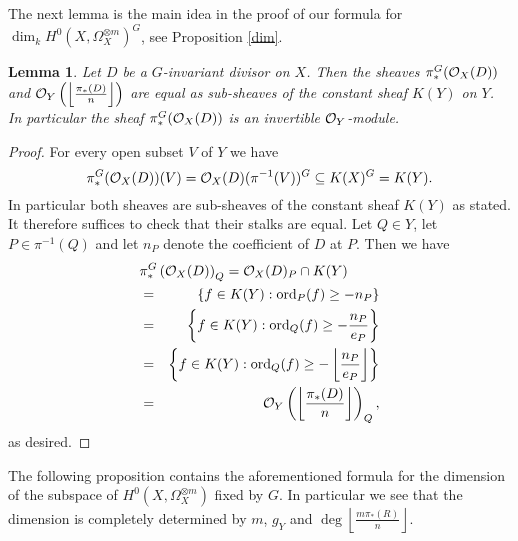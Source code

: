 \documentclass[11pt]{article} %
\newtheorem{lem}{Lemma}
\theoremstyle{remark}\newtheorem*{rem}{Remark}
\newcommand{\cO}{{\cal O}}
\begin{document}
The next lemma is the main idea in the proof of our formula for $\dim_kH^0(X,\Omega_X^{\otimes m})^G$, see Proposition \ref{dim}. \\


  \begin{lem}
    Let $D$ be a $G$-invariant divisor on $X$.
    Then the sheaves $\pi_*^G(\cO_X(D))$ and $\cO_Y\left(\left\lfloor \frac{\pi_*(D)}{n}\right \rfloor\right)$ are equal as sub-sheaves of the constant sheaf $K(Y)$ on $Y$. 
    In particular the sheaf $\pi_*^G(\cO_X(D))$ is an invertible $\cO_Y$-module.
  \end{lem}
  \begin{proof}
    For every open subset $V$ of $Y$ we have 
      \[
	 \pi_*^G(\cO_X(D))(V) = \cO_X(D) (\pi^{-1}(V))^G \subseteq K(X)^G = K(Y).
      \]
    In particular both sheaves are sub-sheaves of the constant sheaf $K(Y)$ as stated. 
    It therefore suffices to check that their stalks are equal. 
    Let $Q \in Y$, let $P \in \pi^{-1}(Q)$ and let $n_P$ denote the coefficient of $D$ at $P$. 
    Then we have
      \begin{eqnarray*}
	 \lefteqn{\pi_*^G\left(\cO_X(D)\right)_Q = \cO_X(D)_P \cap K(Y)}\\
	  &=& \left\{f \in K(Y): \textrm{ord}_P(f) \ge -n_P\right\}\\
	  &=& \left\{f \in K(Y): \textrm{ord}_Q(f) \ge - \frac{n_P}{e_P}\right\}\\
	  &=& \left\{ f \in K(Y): \textrm{ord}_Q(f) \ge - \left\lfloor\frac{n_P}{e_P} \right\rfloor \right\}\\
	  &=& \cO_Y\left(\left\lfloor \frac{\pi_*(D)}{n} \right\rfloor\right)_Q,
      \end{eqnarray*}
    as desired.
  \end{proof}

The following proposition contains the aforementioned formula for the dimension of the subspace of $H^0(X,\Omega_X^{\otimes m})$ fixed by $G$.
In particular we see that the dimension is completely determined by $m$, $g_Y$ and $\deg \left\lfloor \frac{m\pi_*(R)}{n} \right\rfloor$.\\
\end{document}
